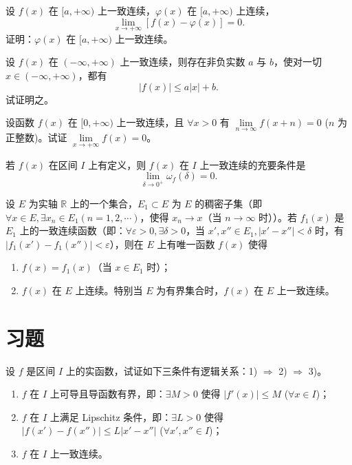 \documentclass[lang=cn,newtx,10pt,scheme=chinese]{elegantbook}
\begin{document}
\begin{example}
    设 $f(x)$ 在 $[a, +\infty)$ 上一致连续，$\varphi(x)$ 在 $[a, +\infty)$ 上连续，
\[
\lim_{x \to +\infty} [f(x) - \varphi(x)] = 0.
\]
证明：$\varphi(x)$ 在 $[a, +\infty)$ 上一致连续。
\end{example}

\begin{example}
设 $f(x)$ 在 $(-\infty, +\infty)$ 上一致连续，则存在非负实数 $a$ 与 $b$，使对一切 $x \in (-\infty, +\infty)$，都有
\[
|f(x)| \leq a |x| + b.
\]
试证明之。
\end{example}

\begin{example}
    设函数 $f(x)$ 在 $[0, +\infty)$ 上一致连续，且 $\forall x > 0$ 有 $\lim\limits_{n \to \infty} f(x+n)=0$ ($n$ 为正整数)。试证 $\lim\limits_{x \to +\infty} f(x)=0$。
\end{example}


\begin{example}
    若 $f(x)$ 在区间 $I$ 上有定义，则 $f(x)$ 在 $I$ 上一致连续的充要条件是
\[
\lim_{\delta \to 0^+} \omega_f(\delta) = 0.
\]
\end{example}

\begin{example}
    设 $E$ 为实轴 $\mathbb{R}$ 上的一个集合，$E_1 \subset E$ 为 $E$ 的稠密子集（即 $\forall x \in E, \exists x_n \in E_1 (n=1,2,\cdots)$，使得 $x_n \to x$（当 $n \to \infty$ 时））。若 $f_1(x)$ 是 $E_1$ 上的一致连续函数（即：$\forall \varepsilon >0, \exists \delta >0$，当 $x',x'' \in E_1, |x'-x''| < \delta$ 时，有 $|f_1(x') - f_1(x'')| < \varepsilon$），则在 $E$ 上有唯一函数 $f(x)$ 使得
    \begin{enumerate}
        \item $f(x) = f_1(x)$（当 $x \in E_1$ 时）；
        \item $f(x)$ 在 $E$ 上连续。特别当 $E$ 为有界集合时，$f(x)$ 在 $E$ 上一致连续。
    \end{enumerate}
\end{example}

\section*{习题}
\begin{problem}
    设 \( f \) 是区间 \( I \) 上的实函数，试证如下三条件有逻辑关系：1) $\Rightarrow$ 2) $\Rightarrow$ 3)。
    \begin{enumerate}[label=\arabic*), leftmargin=*, nosep]
        \item \( f \) 在 \( I \) 上可导且导函数有界，即：\(\exists M > 0\) 使得 \( |f'(x)| \leq M \) (\(\forall x \in I\))；
        
        \item \( f \) 在 \( I \) 上满足 Lipschitz 条件，即：\(\exists L > 0\) 使得 \( |f(x') - f(x'')| \leq L |x' - x''| \) (\(\forall x', x'' \in I\))；
        
        \item \( f \) 在 \( I \) 上一致连续。
    \end{enumerate}
\end{problem}
\end{document}
